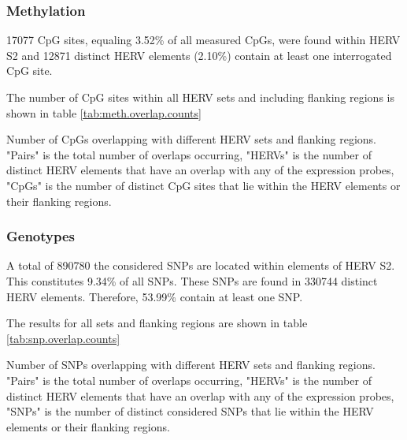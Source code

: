 \documentclass[a4paper,12pt]{article}
\begin{document}
\subsubsection{Methylation}
17077 CpG sites, equaling 3.52\% of all measured CpGs, were found within HERV S2 and 12871 distinct HERV elements (2.10\%) contain at least one interrogated CpG site.



The number of CpG sites within all HERV sets and including flanking regions is shown in table \ref{tab:meth.overlap.counts}

\begin{table}[h!]
  \begin{center}
  \end{center}        
	\caption{Number of CpGs overlapping with different HERV sets and flanking regions. "Pairs" is the total number of overlaps occurring, "HERVs" is the number of distinct HERV elements that have an overlap with any of the expression probes, "CpGs" is the number of distinct CpG sites that lie within the HERV elements or their flanking regions.}
	\label{tab:meth.overlap.counts}
\end{table} 
\subsubsection{Genotypes}
A total of 890780 the considered SNPs are located within elements of HERV S2. This constitutes 9.34\% of all SNPs. These SNPs are found in 330744 distinct HERV elements. Therefore, 53.99\% contain at least one SNP.

The results for all sets and flanking regions are shown in table \ref{tab:snp.overlap.counts}

\begin{table}[h!]
  \begin{center}
  \end{center}        
	\caption{Number of SNPs overlapping with different HERV sets and flanking regions. "Pairs" is the total number of overlaps occurring, "HERVs" is the number of distinct HERV elements that have an overlap with any of the expression probes, "SNPs" is the number of distinct considered SNPs that lie within the HERV elements or their flanking regions.}
	\label{tab:snp.overlap.counts}
\end{table} 
\end{document}
